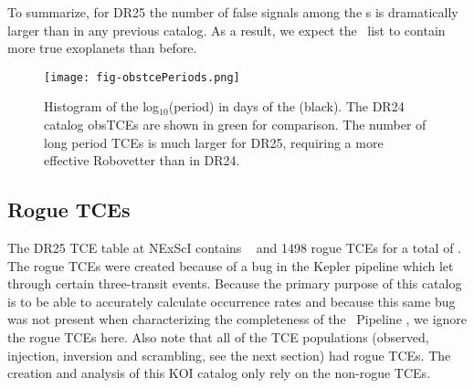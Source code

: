 To summarize, for DR25 the number of false signals among the \opstce s  is dramatically larger than in any previous catalog. As a result, we expect the \opstce\ list to contain more true exoplanets than before.   

\begin{figure}[h!]
 \begin{center}
  \texttt{[image: fig-obstcePeriods.png]}
  \caption{Histogram of the log$_{10}$(period) in days of the  (black). The DR24 catalog obsTCEs \citet{Seader2015} are shown in green for comparison. The number of long period TCEs is much larger for DR25, requiring a more effective Robovetter than in DR24.}
  \label{f:obstces} 
 \end{center}
 \end{figure}



\subsection{Rogue TCEs}
The DR25 TCE table at NExScI contains \ntcesnorogue\  and 1498 rogue TCEs for a total of \ntces. The rogue TCEs were created because of a bug in the Kepler pipeline which let through certain three-transit events. Because the primary purpose of this catalog is to be able to accurately calculate occurrence rates and because this same bug was not present when characterizing the completeness of the \Kepler\ Pipeline \citep{Christiansen2017,Burke2017a,Burke2017b,Burke2017c}, we ignore the rogue TCEs here. Also note that all of the TCE populations (observed, injection, inversion and scrambling, see the next section) had rogue TCEs. The creation and analysis of this KOI catalog only rely on the non-rogue TCEs.

